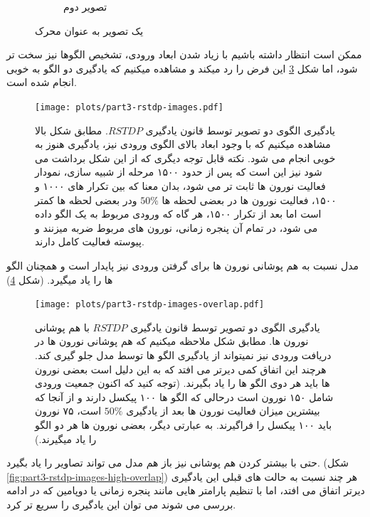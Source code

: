 \begin{figure}[htbp]
\begin{subfigure}[b]{0.35\textwidth}
                \caption{تصویر دوم}
                \label{fig:part3-input-image2}
            \end{subfigure}
            \caption{یک تصویر به عنوان محرک}
            \label{fig:part3-input-images}
        \end{figure}
        ممکن است انتظار داشته باشیم با زیاد شدن ابعاد ورودی، تشخیص الگوها نیز سخت تر شود، اما شکل 
        \ref{fig:part3-rstdp-images}
        این فرض را رد میکند و مشاهده میکنیم که یادگیری دو الگو به خوبی انجام شده است.

        \begin{figure}[!ht]
            \centering
            \captionsetup{width=.9\linewidth}
            \texttt{[image: plots/part3-rstdp-images.pdf]} 
            \caption{یادگیری الگوی دو تصویر توسط قانون یادگیری 
            $RSTDP$. مطابق شکل بالا مشاهده میکنیم که با وجود ابعاد بالای الگوی ورودی نیز، یادگیری هنوز به خوبی انجام می شود. نکته قابل توجه دیگری که از این شکل برداشت می شود نیز این است که پس از حدود ۱۵۰۰ مرحله از شبیه سازی، نمودار فعالیت نورون ها ثابت تر می شود، بدان معنا که بین تکرار های ۱۰۰۰ و ۱۵۰۰، فعالیت نورون ها در بعضی لحظه ها 
            $50\%$ 
            ودر بعضی لحظه ها کمتر است اما بعد از تکرار ۱۵۰۰، هر گاه که ورودی مربوط به یک الگو داده می شود، در تمام آن پنجره زمانی، نورون های مربوط ضربه میزنند و پیوسته فعالیت کامل دارند.
            }
            \label{fig:part3-rstdp-images}
        \end{figure}

        مدل نسبت به هم پوشانی نورون ها برای گرفتن ورودی نیز پایدار است و همچنان الگو ها را یاد میگیرد.
        (شکل \ref{fig:part3-rstdp-images-overlap})
        \begin{figure}[!ht]
            \centering
            \captionsetup{width=.9\linewidth}
            \texttt{[image: plots/part3-rstdp-images-overlap.pdf]} 
            \caption{یادگیری الگوی دو تصویر توسط قانون یادگیری 
            $RSTDP$ با هم پوشانی نورون ها. مطابق شکل ملاحظه میکنیم که هم پوشانی نورون ها در دریافت ورودی نیز نمیتواند از یادگیری الگو ها توسط مدل جلو گیری کند. هرچند این اتفاق کمی دیرتر می افتد که به این دلیل است بعضی نورون ها باید هر دوی الگو ها را یاد بگیرند.
            (توجه کنید که اکنون جمعیت ورودی شامل ۱۵۰ نورون است درحالی که الگو ها ۱۰۰ پیکسل دارند و از آنجا که بیشترین میزان فعالیت نورون ها بعد از یادگیری 
            $50\%$ 
            است، ۷۵ نورون باید ۱۰۰ پیکسل را فراگیرند. به عبارتی دیگر، بعضی نورون ها هر دو الگو را یاد میگیرند.)
            }
            \label{fig:part3-rstdp-images-overlap}
        \end{figure}
        حتی با بیشتر کردن هم پوشانی نیز باز هم مدل می تواند تصاویر را یاد بگیرد.
        (شکل 
        \ref{fig:part3-rstdp-images-high-overlap})
        هر چند نسبت به حالت های قبلی این یادگیری دیرتر اتفاق می افتد، اما با تنظیم پارامتر هایی مانند پنجره زمانی یا دوپامین که در ادامه بررسی می شوند می توان این یادگیری را سریع تر کرد.

